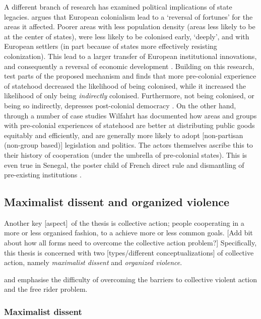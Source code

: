 \documentclass[12pt]{article}
\begin{document}
A different branch of research has examined political implications of
state legacies. \citet{Acemoglu_2002} argues that European colonialism lead to a
`reversal  of fortunes' for the areas it affected. Poorer areas with less
population density (areas less likely to be at the center of states), were less
likely to be colonised early, `deeply', and with European settlers (in part
because of states more effectively resisting colonization). This lead to a
larger transfer of European institutional innovations, and consequently a
reversal of economic development \citep{Acemoglu_2002}. Building on this
research, \citet{Hariri2012} test parts of the proposed mechanism and finds that
more pre-colonial experience of statehood decreased the likelihood of being
colonised, while it increased the likelihood of only being \textit{indirectly}
colonised. Furthermore, not being colonised, or being so indirectly, depresses
post-colonial democracy \citep{Hariri2012}. On the other hand, through a number
of case studies Wilfahrt \citeyear{Wilfahrt2018, Wilfahrt_2021} has documented
how areas and groups with pre-colonial experiences of statehood are better at
distributing public goods equitably and efficiently, and are generally more
likely to adopt [non-partisan (non-group based)] legislation and politics. The
actors themselves ascribe this to their history of cooperation (under the
umbrella of pre-colonial states). This is even true in Senegal, the poster child
of French direct rule and dismantling of pre-existing institutions
\citep{Wilfahrt_2021}.

\subsection{Maximalist dissent and organized violence}
\label{Maximalist dissent and organized violence}

Another key [aspect] of the thesis is collective action; people cooperating in a
more or less organised fashion, to a achieve more or less common goals. [Add bit
about how all forms need to overcome the collective action problem?]
Specifically, this thesis is concerned with two [types/different
conceptualizations] of collective action, namely \textit{maximalist dissent} and
\textit{organized violence}.

\citet{OlsonMancur1965TLoC} and \citet{Tullock_1971}
emphasise the difficulty of overcoming the barriers to collective violent action
and the free rider problem.

\subsubsection{Maximalist dissent} \label{Maximalist dissent}
\end{document}

